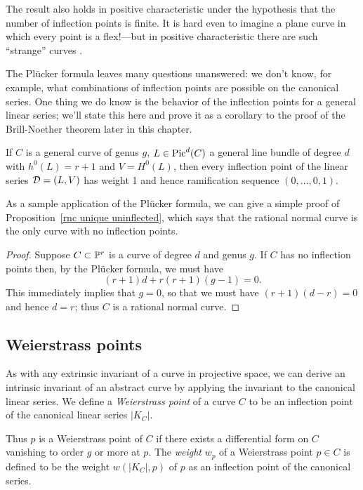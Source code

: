 The result also holds in positive characteristic under the hypothesis that the number of inflection points is finite. It is hard even to imagine a plane curve in which every point is a flex!---but in positive characteristic there are such ``strange'' curves \cite[]{Hartshorne}.

The Pl\"ucker formula leaves many questions unanswered: we don't know, for example, what combinations of inflection points are possible on the canonical series.  One thing we do know is the behavior of the inflection points for a general linear series; we'll state this here and prove it as a corollary to the proof of the Brill-Noether theorem later in this chapter.

\begin{theorem}
If $C$ is a general curve of genus $g$, $L \in \pic^d(C)$ a general line bundle of degree $d$ with $h^0(L) = r+1$ and $V = H^0(L)$, then every inflection point of the linear series $\cD = (L, V)$ has weight 1 and hence ramification sequence $(0, \dots, 0, 1)$.
\end{theorem}

As a sample application of the Pl\"ucker formula, we can give a simple proof of Proposition~\ref{rnc unique uninflected}, which says that the rational normal curve is the only curve with no inflection points. 

\begin{proof}
Suppose $C \subset \PP^r$ is a curve of degree $d$ and genus $g$. If $C$ has no inflection points then, by the Pl\"ucker formula, we must have
$$
(r+1)d + r(r+1)(g-1) = 0.
$$
This immediately implies that $g=0$, so that we must have $(r+1)(d-r) = 0$ and hence $d=r$; thus $C$ is a rational normal curve.
\end{proof}

\subsection{Weierstrass points}

As with any extrinsic invariant of a curve in projective space, we can derive an intrinsic invariant of an abstract curve by applying the invariant to the canonical linear series. We define a \emph{Weierstrass point} of a curve $C$ to be an inflection point of the canonical linear series $|K_C|$. 

Thus $p$ is a Weierstrass point of $C$ if there exists a  differential form on $C$ vanishing to order $g$ or more at $p$. The \emph{weight} $w_p$ of a Weierstrass point $p \in C$  is defined to be the weight $w(|K_C|,p)$ of $p$ as an inflection point of the canonical series. 

